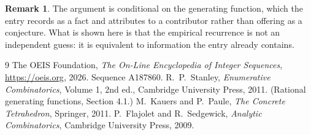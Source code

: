 \documentclass[11pt,a4paper]{article}
\theoremstyle{plain}
\theoremstyle{definition}
\newtheorem{remark}[theorem]{Remark}
\begin{document}
\begin{remark}
The argument is conditional on the generating function, which the entry records as a fact and
attributes to a contributor rather than offering as a conjecture. What is shown here is that
the empirical recurrence is not an independent guess: it is equivalent to information the
entry already contains.
\end{remark}

\begin{thebibliography}{9}
 The OEIS Foundation, \emph{The On-Line Encyclopedia of Integer
Sequences}, \url{https://oeis.org}, 2026. Sequence A187860.
 R.~P.~Stanley, \emph{Enumerative Combinatorics}, Volume 1, 2nd ed.,
Cambridge University Press, 2011. (Rational generating functions, Section 4.1.)
 M.~Kauers and P.~Paule, \emph{The Concrete Tetrahedron}, Springer, 2011.
 P.~Flajolet and R.~Sedgewick, \emph{Analytic Combinatorics}, Cambridge
University Press, 2009.
\end{thebibliography}
\end{document}
